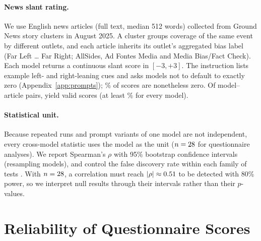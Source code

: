 \documentclass[11pt]{article}
\newcommand{\swatch}[1]{\fcolorbox{gray!50}{#1}{\rule{0pt}{4pt}\rule{6pt}{0pt}}}
\newcommand{\instSAP}[1]{\textcolor{cSAP}{\textbf{#1}}}
\newcommand{\sap}{\instSAP{SapplyValues}\xspace}
\begin{document}
\paragraph{News slant rating.}
We use \nNArticles{} English news articles (full text, median 512 words) collected from \nNStories{} Ground News story clusters in August 2025. A cluster groups coverage of the same event by different outlets, and each article inherits its outlet's aggregated bias label (Far Left \dots{} Far Right; AllSides, Ad Fontes Media and Media Bias/Fact Check). Each model returns a continuous slant score in $[-3,+3]$. The instruction lists example left- and right-leaning cues and asks models not to default to exactly zero (Appendix~\ref{app:prompts}); \nFracZero\% of scores are nonetheless zero. Of \nNPredsPossible{} model--article pairs, \nNPreds{} yield valid scores (at least \nValidMin\% for every model).

\paragraph{Statistical unit.}
Because repeated runs and prompt variants of one model are not independent, every cross-model statistic uses the model as the unit ($n=28$ for questionnaire analyses). We report Spearman's $\rho$ with 95\% bootstrap confidence intervals (resampling models), and control the false discovery rate within each family of tests \citep{benjamini1995controlling}. With $n=28$, a correlation must reach $|\rho|\approx0.51$ to be detected with 80\% power, so we interpret null results through their intervals rather than their $p$-values.

\section{Reliability of Questionnaire Scores}
\label{sec:reliability}

\begin{table}[t]
\centering
\small
\setlength{\tabcolsep}{3.4pt}
\caption{Reliability. \emph{Repeated runs}: \nNModelsMulti{} models $\times$ 10 runs under one prompt. \emph{Paraphrases}: two-way ANOVA over 7 further models $\times$ 10 paraphrased instructions from \citet{rottger-etal-2024-political} (Appendix~\ref{app:paraphrase}). \emph{Item agr.}: mean share of runs giving a model's modal answer to an item. \swatch{hlWarn}~\sap authority, the only axis that is unreliable both across runs and under paraphrase.}
\label{tab:reliability}
\vspace{-3mm}
\end{table}
\end{document}

